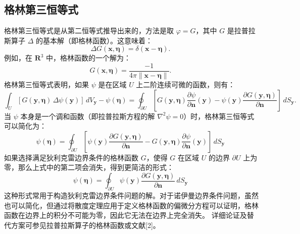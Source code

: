 \subsection{格林第三恒等式}
格林第三恒等式是从第二恒等式推导出来的，方法是取 $\varphi = G$，其中 $G$ 是拉普拉斯算子 $\Delta$ 的基本解（即格林函数）。这意味着：
$$
\Delta G(\mathbf{x}, \boldsymbol{\eta}) = \delta(\mathbf{x} - \boldsymbol{\eta}).~
$$
例如，在 $\mathbf{R}^3$ 中，格林函数的一个解为：
$$
G(\mathbf{x}, \boldsymbol{\eta}) = \frac{-1}{4\pi \|\mathbf{x} - \boldsymbol{\eta}\|}.~
$$
格林第三恒等式表明，如果 $\psi$ 是在区域 $U$ 上二阶连续可微的函数，则有：
$$
\int_{U} \left[ G(\mathbf{y}, \boldsymbol{\eta}) \, \Delta \psi(\mathbf{y}) \right] \, dV_{\mathbf{y}}
- \psi(\boldsymbol{\eta})
=
\oint_{\partial U} 
\left[
G(\mathbf{y}, \boldsymbol{\eta}) 
\frac{\partial \psi}{\partial \mathbf{n}} (\mathbf{y})
-
\psi(\mathbf{y})
\frac{\partial G(\mathbf{y}, \boldsymbol{\eta})}{\partial \mathbf{n}}
\right] 
\, dS_{\mathbf{y}}.~
$$
当 $\psi$ 本身是一个调和函数（即拉普拉斯方程的解 $\nabla^2 \psi = 0$）时，格林第三恒等式可以简化为：
$$
\psi(\boldsymbol{\eta}) 
= 
\oint_{\partial U} 
\left[
\psi(\mathbf{y}) 
\frac{\partial G(\mathbf{y}, \boldsymbol{\eta})}{\partial \mathbf{n}}
-
G(\mathbf{y}, \boldsymbol{\eta}) 
\frac{\partial \psi}{\partial \mathbf{n}}(\mathbf{y})
\right] 
\, dS_{\mathbf{y}}~
$$
如果选择满足狄利克雷边界条件的格林函数 $G$，使得 $G$ 在区域 $U$ 的边界 $\partial U$ 上为零，那么上式中的第二项会消失，得到更简洁的形式：
$$
\psi(\boldsymbol{\eta}) 
= 
\oint_{\partial U} 
\psi(\mathbf{y}) 
\frac{\partial G(\mathbf{y}, \boldsymbol{\eta})}{\partial \mathbf{n}}
\, dS_{\mathbf{y}}~
$$
这种形式常用于构造狄利克雷边界条件问题的解。对于诺伊曼边界条件问题，虽然也可以简化，但通过将散度定理应用于定义格林函数的偏微分方程可以证明，格林函数在边界上的积分不可能为零，因此它无法在边界上完全消失。
详细论证及替代方案可参见拉普拉斯算子的格林函数或文献[2]。
